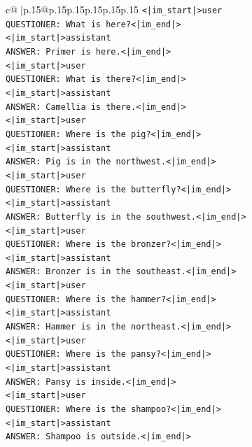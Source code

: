 \documentclass{article}
\begin{document}
{\begin{supertabular}{c@{$\;$}|p{.15\linewidth}@{}p{.15\linewidth}p{.15\linewidth}p{.15\linewidth}p{.15\linewidth}p{.15\linewidth}}
{{{\texttt{<|im\_start|>user} \\
\texttt{QUESTIONER: What is here?<|im\_end|>} \\
\texttt{<|im\_start|>assistant} \\
\texttt{ANSWER: Primer is here.<|im\_end|>} \\
\texttt{<|im\_start|>user} \\
\texttt{QUESTIONER: What is there?<|im\_end|>} \\
\texttt{<|im\_start|>assistant} \\
\texttt{ANSWER: Camellia is there.<|im\_end|>} \\
\texttt{<|im\_start|>user} \\
\texttt{QUESTIONER: Where is the pig?<|im\_end|>} \\
\texttt{<|im\_start|>assistant} \\
\texttt{ANSWER: Pig is in the northwest.<|im\_end|>} \\
\texttt{<|im\_start|>user} \\
\texttt{QUESTIONER: Where is the butterfly?<|im\_end|>} \\
\texttt{<|im\_start|>assistant} \\
\texttt{ANSWER: Butterfly is in the southwest.<|im\_end|>} \\
\texttt{<|im\_start|>user} \\
\texttt{QUESTIONER: Where is the bronzer?<|im\_end|>} \\
\texttt{<|im\_start|>assistant} \\
\texttt{ANSWER: Bronzer is in the southeast.<|im\_end|>} \\
\texttt{<|im\_start|>user} \\
\texttt{QUESTIONER: Where is the hammer?<|im\_end|>} \\
\texttt{<|im\_start|>assistant} \\
\texttt{ANSWER: Hammer is in the northeast.<|im\_end|>} \\
\texttt{<|im\_start|>user} \\
\texttt{QUESTIONER: Where is the pansy?<|im\_end|>} \\
\texttt{<|im\_start|>assistant} \\
\texttt{ANSWER: Pansy is inside.<|im\_end|>} \\
\texttt{<|im\_start|>user} \\
\texttt{QUESTIONER: Where is the shampoo?<|im\_end|>} \\
\texttt{<|im\_start|>assistant} \\
\texttt{ANSWER: Shampoo is outside.<|im\_end|>} \\
}}}
\end{supertabular}}
\end{document}
